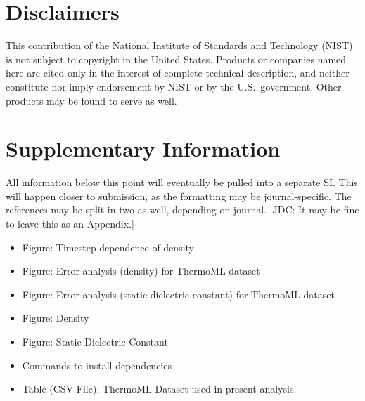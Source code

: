 \documentclass[aps,pre,twocolumn,nofootinbib,superscriptaddress,linenumbers]{revtex4-1}
\begin{document}
\section{Disclaimers}

This contribution of the National Institute of Standards and Technology (NIST) is not subject to copyright in the United States.  
Products or companies named here are cited only in the interest of complete technical description, and neither constitute nor imply endorsement by NIST or by the U.S.~government.  
Other products may be found to serve as well.

\clearpage

\appendix 

\section{Supplementary Information}

All information below this point will eventually be pulled into a separate SI.  
This will happen closer to submission, as the formatting may be journal-specific.  
The references may be split in two as well, depending on journal.
{\color{red}[JDC: It may be fine to leave this as an Appendix.]}

\begin{itemize}
 \item Figure: Timestep-dependence of density
 \item Figure: Error analysis (density) for ThermoML dataset
 \item Figure: Error analysis (static dielectric constant) for ThermoML dataset
 \item Figure: Density
 \item Figure: Static Dielectric Constant
 \item Commands to install dependencies
 \item Table (CSV File): ThermoML Dataset used in present analysis.
\end{itemize}

\clearpage
\end{document}
